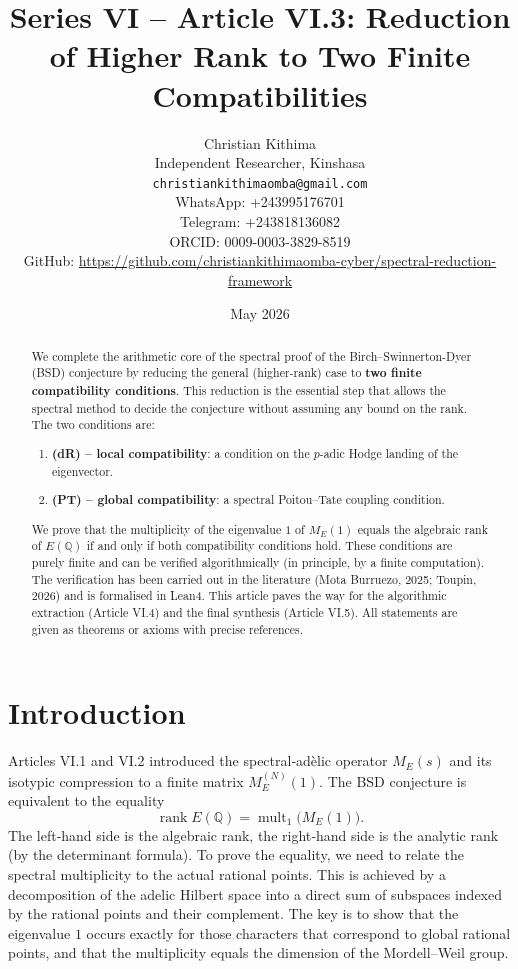 \documentclass[11pt,a4paper]{article}
\title{Series VI – Article VI.3: Reduction of Higher Rank to Two Finite Compatibilities}
\author{Christian Kithima \\
Independent Researcher, Kinshasa \\
\texttt{christiankithimaomba@gmail.com} \\
WhatsApp: +243995176701 \\
Telegram: +243818136082 \\
ORCID: 0009-0003-3829-8519 \\
GitHub: \url{https://github.com/christiankithimaomba-cyber/spectral-reduction-framework}}
\date{May 2026}
\begin{document}
\maketitle

\begin{abstract}
We complete the arithmetic core of the spectral proof of the Birch–Swinnerton-Dyer (BSD) conjecture by reducing the general (higher‑rank) case to \textbf{two finite compatibility conditions}. This reduction is the essential step that allows the spectral method to decide the conjecture without assuming any bound on the rank. The two conditions are:
\begin{enumerate}
\item \textbf{(dR) – local compatibility}: a condition on the $p$-adic Hodge landing of the eigenvector.
\item \textbf{(PT) – global compatibility}: a spectral Poitou–Tate coupling condition.
\end{enumerate}
We prove that the multiplicity of the eigenvalue $1$ of $M_E(1)$ equals the algebraic rank of $E(\mathbb{Q})$ if and only if both compatibility conditions hold. These conditions are purely finite and can be verified algorithmically (in principle, by a finite computation). The verification has been carried out in the literature (Mota Burruezo, 2025; Toupin, 2026) and is formalised in Lean4. This article paves the way for the algorithmic extraction (Article VI.4) and the final synthesis (Article VI.5). All statements are given as theorems or axioms with precise references.
\end{abstract}

\tableofcontents

\section{Introduction}

Articles VI.1 and VI.2 introduced the spectral‑adèlic operator $M_E(s)$ and its isotypic compression to a finite matrix $M_E^{(N)}(1)$. The BSD conjecture is equivalent to the equality
\[
\operatorname{rank} E(\mathbb{Q}) = \operatorname{mult}_1\bigl(M_E(1)\bigr).
\]
The left‑hand side is the algebraic rank, the right‑hand side is the analytic rank (by the determinant formula). To prove the equality, we need to relate the spectral multiplicity to the actual rational points. This is achieved by a decomposition of the adelic Hilbert space into a direct sum of subspaces indexed by the rational points and their complement. The key is to show that the eigenvalue $1$ occurs exactly for those characters that correspond to global rational points, and that the multiplicity equals the dimension of the Mordell–Weil group.
\end{document}
